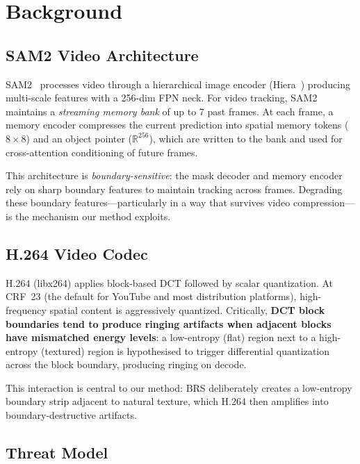 \section{Background}
\label{sec:background}

\subsection{SAM2 Video Architecture}
\label{sec:sam2}

SAM2~\citep{ravi2024sam2} processes video through a hierarchical image encoder (Hiera~\citep{ryali2023hiera}) producing multi-scale features with a 256-dim FPN neck.
For video tracking, SAM2 maintains a \emph{streaming memory bank} of up to 7 past frames.
At each frame, a memory encoder compresses the current prediction into spatial memory tokens ($8 \times 8$) and an object pointer ($\mathbb{R}^{256}$), which are written to the bank and used for cross-attention conditioning of future frames.

This architecture is \emph{boundary-sensitive}: the mask decoder and memory encoder rely on sharp boundary features to maintain tracking across frames.
Degrading these boundary features---particularly in a way that survives video compression---is the mechanism our method exploits.

\subsection{H.264 Video Codec}
\label{sec:codec}

H.264 (libx264) applies block-based DCT followed by scalar quantization.
At CRF~23 (the default for YouTube and most distribution platforms), high-frequency spatial content is aggressively quantized.
Critically, \textbf{DCT block boundaries tend to produce ringing artifacts when adjacent blocks have mismatched energy levels}: a low-entropy (flat) region next to a high-entropy (textured) region is hypothesised to trigger differential quantization across the block boundary, producing ringing on decode.

This interaction is central to our method: BRS deliberately creates a low-entropy boundary strip adjacent to natural texture, which H.264 then amplifies into boundary-destructive artifacts.

\subsection{Threat Model}
\label{sec:threat}

